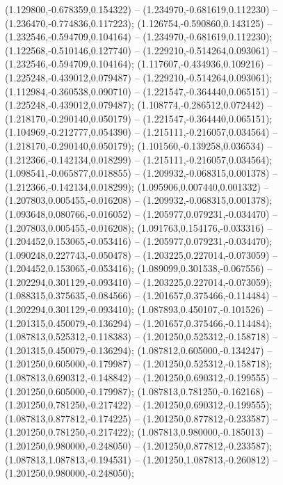  (1.129800,-0.678359,0.154322) -- (1.234970,-0.681619,0.112230) -- (1.236470,-0.774836,0.117223);
 (1.126754,-0.590860,0.143125) -- (1.232546,-0.594709,0.104164) -- (1.234970,-0.681619,0.112230);
 (1.122568,-0.510146,0.127740) -- (1.229210,-0.514264,0.093061) -- (1.232546,-0.594709,0.104164);
 (1.117607,-0.434936,0.109216) -- (1.225248,-0.439012,0.079487) -- (1.229210,-0.514264,0.093061);
 (1.112984,-0.360538,0.090710) -- (1.221547,-0.364440,0.065151) -- (1.225248,-0.439012,0.079487);
 (1.108774,-0.286512,0.072442) -- (1.218170,-0.290140,0.050179) -- (1.221547,-0.364440,0.065151);
 (1.104969,-0.212777,0.054390) -- (1.215111,-0.216057,0.034564) -- (1.218170,-0.290140,0.050179);
 (1.101560,-0.139258,0.036534) -- (1.212366,-0.142134,0.018299) -- (1.215111,-0.216057,0.034564);
 (1.098541,-0.065877,0.018855) -- (1.209932,-0.068315,0.001378) -- (1.212366,-0.142134,0.018299);
 (1.095906,0.007440,0.001332) -- (1.207803,0.005455,-0.016208) -- (1.209932,-0.068315,0.001378);
 (1.093648,0.080766,-0.016052) -- (1.205977,0.079231,-0.034470) -- (1.207803,0.005455,-0.016208);
 (1.091763,0.154176,-0.033316) -- (1.204452,0.153065,-0.053416) -- (1.205977,0.079231,-0.034470);
 (1.090248,0.227743,-0.050478) -- (1.203225,0.227014,-0.073059) -- (1.204452,0.153065,-0.053416);
 (1.089099,0.301538,-0.067556) -- (1.202294,0.301129,-0.093410) -- (1.203225,0.227014,-0.073059);
 (1.088315,0.375635,-0.084566) -- (1.201657,0.375466,-0.114484) -- (1.202294,0.301129,-0.093410);
 (1.087893,0.450107,-0.101526) -- (1.201315,0.450079,-0.136294) -- (1.201657,0.375466,-0.114484);
 (1.087813,0.525312,-0.118383) -- (1.201250,0.525312,-0.158718) -- (1.201315,0.450079,-0.136294);
 (1.087812,0.605000,-0.134247) -- (1.201250,0.605000,-0.179987) -- (1.201250,0.525312,-0.158718);
 (1.087813,0.690312,-0.148842) -- (1.201250,0.690312,-0.199555) -- (1.201250,0.605000,-0.179987);
 (1.087813,0.781250,-0.162168) -- (1.201250,0.781250,-0.217422) -- (1.201250,0.690312,-0.199555);
 (1.087813,0.877812,-0.174225) -- (1.201250,0.877812,-0.233587) -- (1.201250,0.781250,-0.217422);
 (1.087813,0.980000,-0.185013) -- (1.201250,0.980000,-0.248050) -- (1.201250,0.877812,-0.233587);
 (1.087813,1.087813,-0.194531) -- (1.201250,1.087813,-0.260812) -- (1.201250,0.980000,-0.248050);
